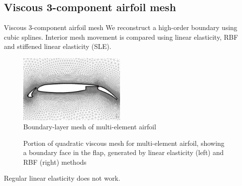 \documentclass[t,12pt]{beamer}
\begin{document}
\subsection{Viscous 3-component airfoil mesh}
\begin{frame}{Viscous 3-component airfoil mesh}
We reconstruct a high-order boundary using cubic splines. Interior mesh movement is compared using linear elasticity, RBF and stiffened linear elasticity (SLE).
\begin{figure}
	\centering
	\includegraphics[width=150.0pt]{3compblack}
	\caption{Boundary-layer mesh of multi-element airfoil}
\end{figure}
\end{frame}

\begin{frame}
	 \begin{figure}
	 	\centering
	 	\caption{Portion of quadratic viscous mesh for multi-element airfoil, showing a boundary face in the flap, generated by linear elasticity (left) and RBF (right) methods}
	 	\label{fig:tangled2}
	 \end{figure}
	 Regular linear elasticity does not work.
\end{frame}
\end{document}
